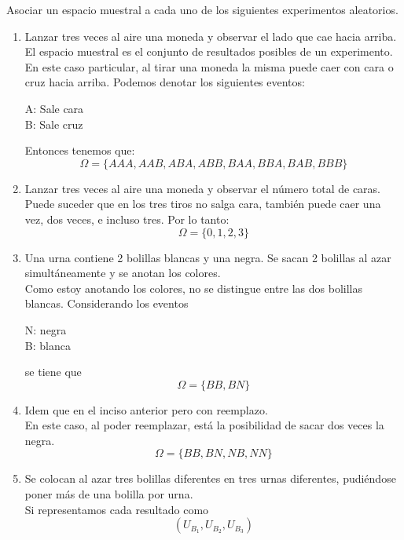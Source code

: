 \item Asociar un espacio muestral a cada uno de los siguientes experimentos aleatorios.
    \begin{enumerate}
        \item Lanzar tres veces al aire una moneda y observar el lado que cae hacia arriba.\e\\
            El espacio muestral es el conjunto de resultados posibles de un experimento. En este caso particular, al tirar una moneda la misma puede caer con cara o cruz hacia arriba. Podemos denotar los siguientes eventos:
            \begin{center}
                A: Sale cara\\
                B: Sale cruz
            \end{center}
            Entonces tenemos que:\[\Omega=\{AAA,AAB,ABA,ABB,BAA,BBA,BAB,BBB\}\]
        \item Lanzar tres veces al aire una moneda y observar el número total de caras.\e\\
            Puede suceder que en los tres tiros no salga cara, también puede caer una vez, dos veces, e incluso tres. Por lo tanto:\[\Omega=\{0,1,2,3\}\]
        \item Una urna contiene 2 bolillas blancas y una negra. Se sacan 2 bolillas al azar simultáneamente y se anotan los colores.\e\\
            Como estoy anotando los colores, no se distingue entre las dos bolillas blancas. Considerando los eventos
            \begin{center}
                N: negra\\
                B: blanca
            \end{center}
            se tiene que\[\Omega=\{BB,BN\}\]
        \item Idem que en el inciso anterior pero con reemplazo.\e\\
            En este caso, al poder reemplazar, está la posibilidad de sacar dos veces la negra.\[\Omega=\{BB,BN,NB,NN\}\]
        \item Se colocan al azar tres bolillas diferentes en tres urnas diferentes, pudiéndose poner más de una bolilla por urna.\e\\
            Si representamos cada resultado como \[(U_{B_1},U_{B_2},U_{B_3})\]

\end{enumerate}
